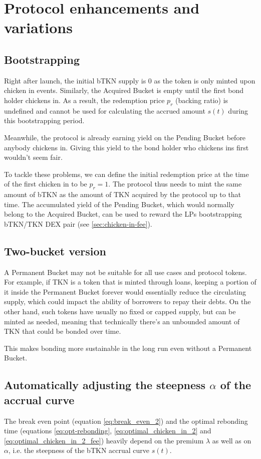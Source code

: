 \documentclass{article}
\begin{document}
\section{Protocol enhancements and variations}
\subsection{Bootstrapping}
  \label{sec:bootstrapping}
Right after launch, the initial bTKN supply is 0 as the token is only minted upon chicken in events. Similarly, the Acquired Bucket is empty until the first bond holder chickens in. As a result, the redemption price $p_r$ (backing ratio) is undefined and cannot be used for calculating the accrued amount $s(t)$ during this bootstrapping period.

Meanwhile, the protocol is already earning yield on the Pending Bucket before anybody chickens in. Giving this yield to the bond holder who chickens ins first wouldn't seem fair. 

To tackle these problems, we can define the initial redemption price at the time of the first chicken in to be $p_r = 1$. The protocol thus needs to mint the same amount of bTKN as the amount of TKN acquired by the protocol up to that time. The accumulated yield of the Pending Bucket, which would normally belong to the Acquired Bucket, can be used to reward the LPs bootstrapping bTKN/TKN DEX pair (see \ref{sec:chicken-in-fee}).

\subsection{Two-bucket version}
\label{sec:two-bucket}
A Permanent Bucket may not be suitable for all use cases and protocol tokens. For example, if TKN is a token that is minted through loans, keeping a portion of it inside the Permanent Bucket forever would essentially reduce the circulating supply, which could impact the ability of borrowers to repay their debts. On the other hand, such tokens have usually no fixed or capped supply, but can be minted as needed, meaning that technically there's an unbounded amount of TKN that could be bonded over time.

This makes bonding more sustainable in the long run even without a Permanent Bucket.


\subsection{Automatically adjusting the steepness $\alpha$ of the accrual curve}
  \label{sec:adjustment}
The break even point (equation \ref{eq:break_even_2}) and the optimal rebonding time (equations \ref{eq:opt-rebonding}, \ref{eq:optimal_chicken_in_2} and \ref{eq:optimal_chicken_in_2_fee}) heavily depend on the premium $\lambda$ as well as on $\alpha$, i.e. the steepness of the bTKN accrual curve $s(t)$. 
\end{document}
